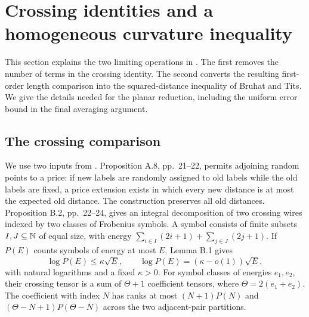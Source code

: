 \section{Crossing identities and a homogeneous curvature inequality}
\label{sec:curvature}

This section explains the two limiting operations in
\cite[Proposition B.3 and Theorem C.1, pp.~24--28]{Anthropic2026}.
The first removes the number of terms in the crossing identity.
The second converts the resulting first-order length comparison into
the squared-distance inequality of Bruhat and Tits.
We give the details needed for the planar reduction, including the
uniform error bound in the final averaging argument.

\subsection{The crossing comparison}

We use two inputs from \cite{Anthropic2026}.
Proposition A.8, pp.~21--22, permits adjoining random points to a
price: if new labels are randomly assigned to old labels while the
old labels are fixed, a price extension exists in which every new
distance is at most the expected old distance.
The construction preserves all old distances.
Proposition B.2, pp.~22--24, gives an integral decomposition of two
crossing wires indexed by two classes of Frobenius symbols.
A symbol consists of finite subsets $I,J\subseteq\mathbb N$ of equal size,
with energy $\sum_{i\in I}(2i+1)+\sum_{j\in J}(2j+1)$.
If $P(E)$ counts symbols of energy at most $E$, Lemma B.1 gives
\[
 \log P(E)\leq \kappa\sqrt E,\qquad
 \log P(E)=(\kappa-o(1))\sqrt E,
\]
with natural logarithms and a fixed $\kappa>0$.
For symbol classes of energies $e_1,e_2$, their crossing tensor is
a sum of $\Theta+1$ coefficient tensors, where
$\Theta=2(e_1+e_2)$.
The coefficient with index $N$ has ranks at most
$(N+1)P(N)$ and $(\Theta-N+1)P(\Theta-N)$ across the two
adjacent-pair partitions.


